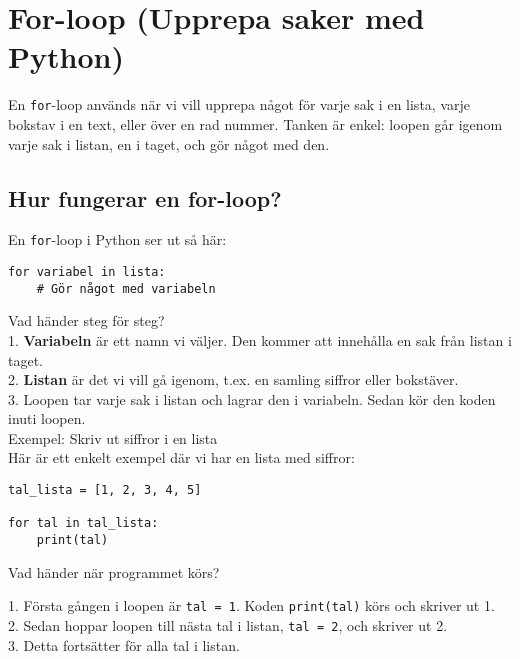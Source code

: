 \section{For-loop (Upprepa saker med Python)}
\label{section:for}

En \texttt{for}-loop används när vi vill upprepa något för varje sak i en lista, varje bokstav i en text, eller över en rad nummer. Tanken är enkel: loopen går igenom varje sak i listan, en i taget, och gör något med den.

\subsection{Hur fungerar en for-loop?}

En \texttt{for}-loop i Python ser ut så här:

\begin{lstlisting}[title=Syntax för for-loop]
for variabel in lista:
    # Gör något med variabeln
\end{lstlisting}

Vad händer steg för steg?\\

1. \textbf{Variabeln} är ett namn vi väljer. Den kommer att innehålla en sak från listan i taget.\\
2. \textbf{Listan} är det vi vill gå igenom, t.ex. en samling siffror eller bokstäver.\\
3. Loopen tar varje sak i listan och lagrar den i variabeln. Sedan kör den koden inuti loopen.\\

Exempel: Skriv ut siffror i en lista\\

Här är ett enkelt exempel där vi har en lista med siffror:

\begin{lstlisting}[title=Exempel: Skriv ut siffror]
tal_lista = [1, 2, 3, 4, 5]

for tal in tal_lista:
    print(tal)
\end{lstlisting}

Vad händer när programmet körs?

1. Första gången i loopen är \texttt{tal = 1}. Koden \texttt{print(tal)} körs och skriver ut 1.\\
2. Sedan hoppar loopen till nästa tal i listan, \texttt{tal = 2}, och skriver ut 2.\\
3. Detta fortsätter för alla tal i listan.\\


